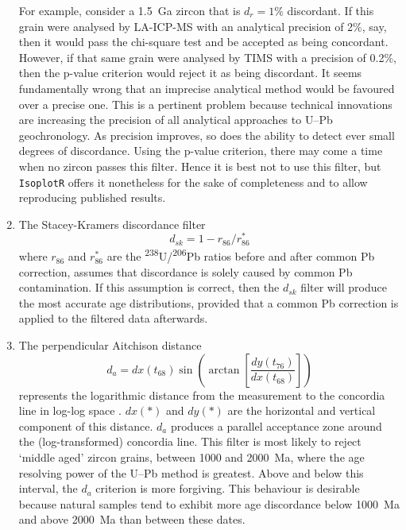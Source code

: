 \begin{refsection}
\begin{enumerate}
    For example, consider a 1.5~Ga zircon that is $d_r=1\%$
    discordant. If this grain were analysed by LA-ICP-MS with an
    analytical precision of 2\%, say, then it would pass the
    chi-square test and be accepted as being concordant. However, if
    that same grain were analysed by TIMS with a precision of 0.2\%,
    then the p-value criterion would reject it as being discordant. It
    seems fundamentally wrong that an imprecise analytical method
    would be favoured over a precise one. This is a pertinent problem
    because technical innovations are increasing the precision of all
    analytical approaches to U--Pb geochronology.  As precision
    improves, so does the ability to detect ever small degrees of
    discordance. Using the p-value criterion, there may come a time
    when no zircon passes this filter.  Hence it is best not to use
    this filter, but \texttt{IsoplotR} offers it nonetheless for the
    sake of completeness and to allow reproducing published results.
  \item The Stacey-Kramers discordance filter
    \begin{equation}
      d_{sk} = 1 - r_{86}/r_{86}^\ast
    \end{equation}
    \noindent where $r_{86}$ and $r_{86}^\ast$ are the
    \textsuperscript{238}U/\textsuperscript{206}Pb ratios before and
    after common Pb correction, assumes that discordance is solely
    caused by common Pb contamination. If this assumption is correct,
    then the $d_{sk}$ filter will produce the most accurate age
    distributions, provided that a \citet{stacey1975} common Pb
    correction is applied to the filtered data afterwards.
  \item The perpendicular Aitchison distance
    \begin{equation}
      d_{a} = dx(t_{68}) \sin\!\left(\arctan\!\left[
        \frac{dy(t_{76})}{dx(t_{68})} \right] \right)
    \end{equation}
    \noindent represents the logarithmic distance from the measurement
    to the concordia line in log-log space
    \citep{vermeesch2021}. $dx(\ast)$ and $dy(\ast)$ are the
    horizontal and vertical component of this distance. $d_a$ produces
    a parallel acceptance zone around the (log-transformed) concordia
    line. This filter is most likely to reject `middle aged' zircon
    grains, between 1000 and 2000~Ma, where the age resolving power of
    the U--Pb method is greatest. Above and below this interval, the
    $d_a$ criterion is more forgiving. This behaviour is desirable
    because natural samples tend to exhibit more age discordance below
    1000~Ma and above 2000~Ma than between these dates.


\end{enumerate}
\end{refsection}
